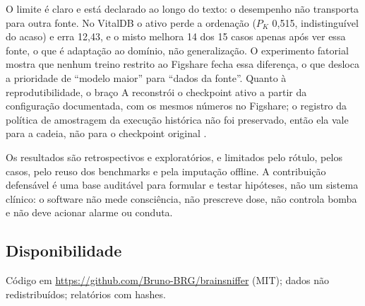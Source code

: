 \documentclass[12pt]{article}
\begin{document}
O limite é claro e está declarado ao longo do texto: o desempenho não transporta para outra fonte. No VitalDB o ativo perde a ordenação ($P_K$ 0,515, indistinguível do acaso) e erra 12,43, e o misto melhora 14 dos 15 casos apenas após ver essa fonte, o que é adaptação ao domínio, não generalização. O experimento fatorial mostra que nenhum treino restrito ao Figshare fecha essa diferença, o que desloca a prioridade de ``modelo maior'' para ``dados da fonte''. Quanto à reprodutibilidade, o braço A reconstrói o checkpoint ativo a partir da configuração documentada, com os mesmos números no Figshare; o registro da política de amostragem da execução histórica não foi preservado, então ela vale para a cadeia, não para o checkpoint original \cite{tripodai}.

Os resultados são retrospectivos e exploratórios, e limitados pelo rótulo, pelos casos, pelo reuso dos benchmarks e pela imputação offline. A contribuição defensável é uma base auditável para formular e testar hipóteses, não um sistema clínico: o software não mede consciência, não prescreve dose, não controla bomba e não deve acionar alarme ou conduta.

\subsection*{Disponibilidade}
Código em \url{https://github.com/Bruno-BRG/brainsniffer} (MIT); dados não redistribuídos; relatórios com hashes.



\end{document}
